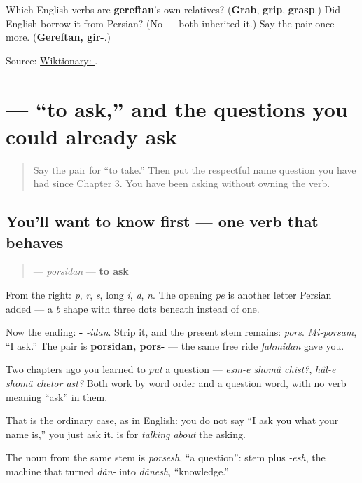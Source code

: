 \begin{tcolorbox}[breakable,colback=teal!4,colframe=teal!35!black,title={Before you move on}]
Which English verbs are \textbf{gereftan}'s own relatives? (\textbf{Grab}, \textbf{grip}, \textbf{grasp}.) Did English borrow it from Persian? (No — both inherited it.) Say the pair once more. (\textbf{Gereftan, gir-}.)

Source: \href{https://en.wiktionary.org/wiki/\%DA\%AF\%D8\%B1\%D9\%81\%D8\%AA\%D9\%86}{Wiktionary: }.
\end{tcolorbox}
\section[\texorpdfstring{\fa{پرسیدن} (porsidan)}{پرسیدن (porsidan)}]{ — “to ask,” and the questions you could already ask}

\label{lesson:FA-C08-porsidan}



\begin{quote}
Say the pair for “to take.” Then put the respectful name question you have had since Chapter 3. You have been asking without owning the verb.
\end{quote}

\subsection*{You'll want to know first — one verb that behaves}
\begin{quote}
\textbf{} — \emph{porsidan} — \textbf{to ask}
\end{quote}

From the right: \textbf{} \emph{p}, \textbf{} \emph{r}, \textbf{} \emph{s}, \textbf{} long \emph{i}, \textbf{} \emph{d}, \textbf{} \emph{n}. The opening \textbf{} \emph{pe} is another letter Persian added — a \emph{b} shape with three dots beneath instead of one.

Now the ending: \textbf{-} \emph{-idan}. Strip it, and the present stem remains: \textbf{} \emph{pors}. \emph{Mi-porsam}, “I ask.” The pair is \textbf{porsidan, pors-} — the same free ride \emph{fahmidan} gave you.

\begin{grammarlens}[title={Grammar Lens: asking a question and asking a person}]
Two chapters ago you learned to \emph{put} a question — \emph{esm-e shomâ chist?}, \emph{hâl-e shomâ chetor ast?} Both work by word order and a question word, with no verb meaning “ask” in them.

That is the ordinary case, as in English: you do not say “I ask you what your name is,” you just ask it. \textbf{} is for \emph{talking about} the asking.

The noun from the same stem is \emph{porsesh}, “a question”: stem plus \emph{-esh}, the machine that turned \textbf{} \emph{dân-} into \emph{dânesh}, “knowledge.”
\end{grammarlens}


